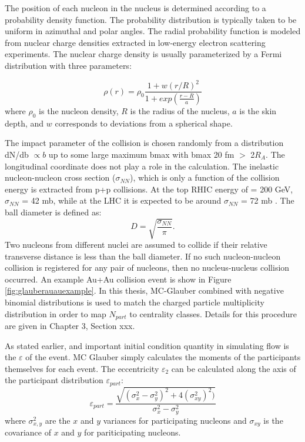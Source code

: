 The position of each nucleon in the nucleus is determined according to a probability density function. The probability distribution is typically taken to be uniform in azimuthal and polar angles. The radial probability function is modeled from nuclear charge densities extracted in low-energy electron scattering experiments. The nuclear charge density is usually parameterized by a Fermi distribution with three parameters:

\begin{equation}
\rho(r) = \rho_0\frac{1+w(r/R)^2}{1+exp(\frac{r-R}{a})}
\end{equation}
where $\rho_0$ is the nucleon density, $R$ is the radius of the nucleus, $a$ is the skin depth, and $w$ corresponds to deviations from a spherical shape. 

The impact parameter of the collision is chosen randomly from a distribution dN/db $\propto b$ up to some large maximum bmax with bmax 20 fm $>$ 2$R_A$. The longitudinal coordinate does not play a role in the calculation. The inelastic nucleon-nucleon cross section ($\sigma_{NN}$), which is only a function of the collision energy is extracted from p+p collisions. At the top RHIC energy of \sqsn = 200 GeV, $\sigma_{NN}$ = 42 mb, while at the LHC it is expected to be around $\sigma_{NN}$ = 72 mb \cite{annurev.nucl.57.090506.123020}. The ball diameter is defined as:
\begin{equation}
D = \sqrt{\frac{\sigma_{NN}}{\pi}}.
\end{equation}
Two nucleons from different nuclei are assumed to collide if their relative transverse distance is less than the ball diameter. If no such nucleon-nucleon collision is registered for any pair of nucleons, then no nucleus-nucleus collision occurred. An example Au+Au collision event is show in Figure \ref{fig:glauberauauexample}. In this thesis, MC-Glauber combined with negative binomial distributions is used to match the charged particle multiplicity distribution in order to map $N_{part}$ to centrality classes. Details for this procedure are given in Chapter 3, Section xxx.

As stated earlier, and important initial condition quantity in simulating flow is the $\varepsilon$ of the event. MC Glauber simply calculates the moments of the participants themselves for each event. The eccentricity $\varepsilon_2$ can be calculated along the axis of the participant distribution $\varepsilon_{part}$:
\begin{equation}
\varepsilon_{part} = \frac{\sqrt{(\sigma_x^2-\sigma_y^2)^2+4(\sigma_{xy}^2)^2)}}{\sigma_x^2-\sigma_y^2}
\end{equation}
where $\sigma_{x,y}^2$ are the $x$ and $y$ variances for participating nucleons and $\sigma_{xy}$ is the covariance of $x$ and $y$ for pariticipating nucleons.

